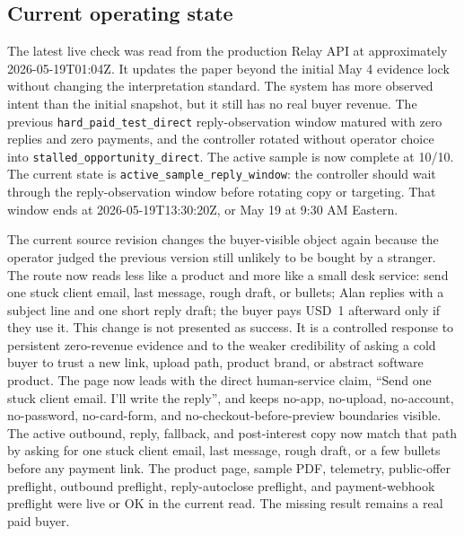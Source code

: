\documentclass[12pt,letterpaper]{article}
\begin{document}
\subsection{Current operating state}

The latest live check was read from the production Relay API at approximately 2026-05-19T01:04Z. It updates the paper beyond the initial May 4 evidence lock without changing the interpretation standard. The system has more observed intent than the initial snapshot, but it still has no real buyer revenue. The previous \texttt{hard\_paid\_test\_direct} reply-observation window matured with zero replies and zero payments, and the controller rotated without operator choice into \texttt{stalled\_opportunity\_direct}. The active sample is now complete at 10/10. The current state is \texttt{active\_sample\_reply\_window}: the controller should wait through the reply-observation window before rotating copy or targeting. That window ends at 2026-05-19T13:30:20Z, or May 19 at 9:30 AM Eastern.

The current source revision changes the buyer-visible object again because the operator judged the previous version still unlikely to be bought by a stranger. The route now reads less like a product and more like a small desk service: send one stuck client email, last message, rough draft, or bullets; Alan replies with a subject line and one short reply draft; the buyer pays USD~1 afterward only if they use it. This change is not presented as success. It is a controlled response to persistent zero-revenue evidence and to the weaker credibility of asking a cold buyer to trust a new link, upload path, product brand, or abstract software product. The page now leads with the direct human-service claim, \enquote{Send one stuck client email. I'll write the reply}, and keeps no-app, no-upload, no-account, no-password, no-card-form, and no-checkout-before-preview boundaries visible. The active outbound, reply, fallback, and post-interest copy now match that path by asking for one stuck client email, last message, rough draft, or a few bullets before any payment link. The product page, sample PDF, telemetry, public-offer preflight, outbound preflight, reply-autoclose preflight, and payment-webhook preflight were live or OK in the current read. The missing result remains a real paid buyer.
\end{document}

